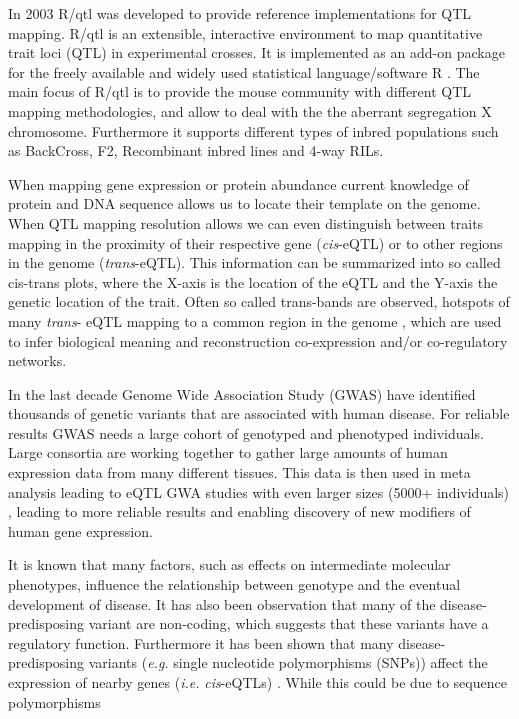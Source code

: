 In 2003 R/qtl was developed to provide reference implementations for QTL mapping. R/qtl is 
an extensible, interactive environment to map quantitative trait loci (QTL) in experimental 
crosses. It is implemented as an add-on package for the freely available and widely used 
statistical language/software R \cite{R:2009}. The main focus of R/qtl is to provide 
the mouse community with different QTL mapping methodologies, and allow to deal with the 
the aberrant segregation X chromosome. Furthermore it supports different types of inbred 
populations such as BackCross, F2, Recombinant inbred lines and 4-way RILs. \cite{Broman:2003}

When mapping gene expression or protein abundance current knowledge of protein and DNA sequence 
allows us to locate their template on the genome. When QTL mapping resolution allows we can even 
distinguish between traits mapping in the proximity of their respective gene (\emph{cis}-eQTL) 
or to other regions in the genome (\emph{trans}-eQTL). This information can be summarized into 
so called cis-trans plots, where the X-axis is the location of the eQTL and the Y-axis the genetic 
location of the trait. Often so called trans-bands are observed, hotspots of many \emph{trans}-
eQTL mapping to a common region in the genome \cite{Breitling:2008a}, which are used to infer 
biological meaning and reconstruction co-expression and/or co-regulatory networks.

In the last decade Genome Wide Association Study (GWAS) have identified thousands of genetic 
variants that are associated with human disease\cite{Hindorff:2009}. For reliable results GWAS 
needs a large cohort of genotyped and phenotyped individuals. Large consortia are working 
together to gather large amounts of human expression data from many different tissues. This 
data is then used in meta analysis leading to eQTL GWA studies with even larger sizes 
(5000+ individuals) \cite{Lude:2011}, leading to more reliable results and enabling discovery 
of new modifiers of human gene expression.

It is known that many factors, such as effects on intermediate molecular phenotypes, influence 
the relationship between genotype and the eventual development of disease. It has also been 
observation that many of the disease-predisposing variant are non-coding, which suggests that 
these variants have a regulatory function. Furthermore it has been shown that many disease-predisposing variants 
(\emph{e.g.} single nucleotide polymorphisms (SNPs)) affect the expression of nearby genes (\emph{i.e.} 
\emph{cis}-eQTLs) \cite{Powell:2012, Lude:2011, Zeller:2010}. While this could be due to sequence 
polymorphisms 

